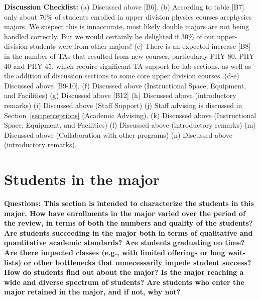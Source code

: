 \documentclass[12pt]{article}
\begin{document}
\noindent
{\bf Discussion Checklist:} (a) Discussed above [B6].  (b) According
to table [B7] only about $70\%$ of students enrolled in upper division
physics courses arephysics majors.  We suspect this is innaccurate,
most likely double majors are not being handled correctly.  But we
would certainly be delighted if 30\% of our upper-division students
were from other majors! (c) There is an expected increase [B8] in the
number of TAs that resulted from new courses, particularly PHY 80, PHY
40 and PHY 45, which require significant TA support for lab sections,
as well as the addition of discussion sections to some core upper
division courses.  (d-e) Discussed above [B9-10]. (f) Discussed above
(Instructional Space, Equipment, and Facilities) (g) Discussed above
[B12] (h) Discussed above (introductory remarks) (i) Discussed above
(Staff Support) (j) Staff advising is discussed in
Section~\ref{sec:perceptions} (Academic Advising).  (k) Discussed
above (Instructional Space, Equipment, and Facilities) (l) Discussed
above (introductory remarks) (m) Discussed above (Collaboration with
other programs) (n) Discussed above (introductory remarks).

\newpage
\section{Students in the major}
\label{sec:students}

{\bf Questions: This section is intended to characterize the students in this major. How have enrollments in the major varied over the period of the review, in terms of both the numbers and quality of the students? Are students succeeding in the major both in terms of qualitative and quantitative academic standards? Are students graduating on time? Are there impacted classes (e.g., with limited offerings or long wait-lists) or other bottlenecks that unnecessarily impede student success? How do students find out about the major?  Is the major reaching a wide and diverse spectrum of students? Are students who enter the major retained in the major, and if not, why not?}\\[3pt]
\end{document}
